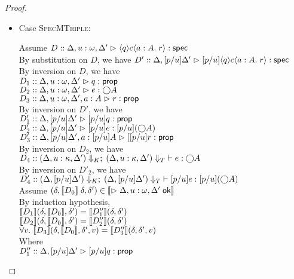 \begin{proof}
\begin{enumerate}
\begin{itemize}
  \item Case \textsc{SpecMTriple}: 
    \begin{tabbedproof}
      \oo Assume $D :: \judgeS[{\Delta, u:\omega, \Delta'}]{\mspec{q}{c}{a:A}{r}}$ \\
      \oo By substitution on $D$, we have $D' :: \judgeS[{\Delta, [p/u]\Delta'}]{[p/u]\mspec{q}{c}{a:A}{r}}$ \\
      \oo By inversion on $D$, we have \\
      \ooo $D_1 :: \judgeA[{\Delta, u:\omega, \Delta'}]{q}{\assert}$ \\
      \ooo $D_2 :: \judgeA[{\Delta, u:\omega, \Delta'}]{e}{\monad{A}}$ \\
      \ooo $D_3 :: \judgeA[{\Delta, u:\omega, \Delta', a:A}]{r}{\assert}$ \\
      \oo By inversion on $D'$, we have \\ 
      \ooo $D'_1 :: \judgeA[{\Delta, [p/u]\Delta'}]{[p/u]q}{\assert}$ \\                  
      \ooo $D'_2 :: \judgeA[{\Delta, [p/u]\Delta'}]{[p/u]e}{[p/u](\monad{A})}$ \\  
      \ooo $D'_3 :: \judgeA[{\Delta, [p/u]\Delta', a:[p/u]A}]{[[p/u]r}{\assert}$ \\       
      \oo By inversion on $D_2$, we have \\
      \ooo $D_4 :: \judgeE[\restrictkind{\Delta,u:\kappa,\Delta'}]
                           {\restricttype{\Delta,u:\kappa,\Delta'}}{e}{\monad{A}}$ \\
      \oo By inversion on $D'_2$, we have \\
      \ooo $D'_4 :: \judgeE[\restrictkind{\Delta,[p/u]\Delta'}]
                           {\restricttype{\Delta,[p/u]\Delta'}}{[p/u]e}{[p/u](\monad{A})}$ \\
      \oo Assume $(\delta, \interp{D_0}\;\delta, \delta')\in \interp{\judgeACtx{\Delta, u:\omega, \Delta'}}$ \\
      \ooo By induction hypothesis, \\
      \oooo $\interp{D_1}(\delta, \interp{D_0}, \delta') = \interp{D''_1}(\delta, \delta')$\\
      \oooo $\interp{D_2}(\delta, \interp{D_0}, \delta') = \interp{D''_2}(\delta, \delta')$\\
      \oooo $\forall v.\; \interp{D_3}(\delta, \interp{D_0}, \delta', v) = \interp{D''_3}(\delta, \delta', v)$\\
      \ooo Where \\ 
      \oooo $D''_1 :: \judgeA[{\Delta, [p/u]\Delta'}]{[p/u]q}{\assert}$ \\                  

\end{tabbedproof}
\end{itemize}
\end{enumerate}
\end{proof}
